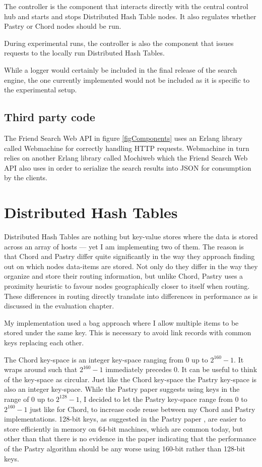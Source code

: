 The controller is the component that interacts directly with the central control hub and starts and stops Distributed Hash Table nodes. It also regulates whether Pastry or Chord nodes should be run.

During experimental runs, the controller is also the component that issues requests to the locally run Distributed Hash Tables.

While a logger would certainly be included in the final release of the search engine, the one currently implemented would not be included as it is specific to the experimental setup.

\subsection{Third party code}
The Friend Search Web API in figure \ref{figComponents} uses an Erlang library called Webmachine for correctly handling HTTP requests. Webmachine in turn relies on another Erlang library called Mochiweb which the Friend Search Web API also uses in order to serialize the search results into JSON for consumption by the clients.

\section{Distributed Hash Tables}
Distributed Hash Tables are nothing but key-value stores where the data is stored across an array of hosts --- yet I am implementing two of them. The reason is that Chord and Pastry differ quite significantly in the way they approach finding out on which nodes data-items are stored. Not only do they differ in the way they organize and store their routing information, but unlike Chord, Pastry uses a proximity heuristic to favour nodes geographically closer to itself when routing. These differences in routing directly translate into differences in performance as is discussed in the evaluation chapter.

My implementation used a bag approach where I allow multiple items to be stored under the same key. This is necessary to avoid link records with common keys replacing each other.

The Chord key-space is an integer key-space ranging from 0 up to $2^{160} - 1$. It wraps around such that $2^{160} - 1$ immediately precedes 0. It can be useful to think of the key-space as circular. Just like the Chord key-space the Pastry key-space is also an integer key-space. While the Pastry paper \cite{pastry} suggests using keys in the range of 0 up to $2^{128} - 1$, I decided to let the Pastry key-space range from 0 to $2^{160} - 1$ just like for Chord, to increase code reuse between my Chord and Pastry implementations.
128-bit keys, as suggested in the Pastry paper \cite{pastry}, are easier to store efficiently in memory on 64-bit machines, which are common today, but other than that there is no evidence in the paper indicating that the performance of the Pastry algorithm should be any worse using 160-bit rather than 128-bit keys.

